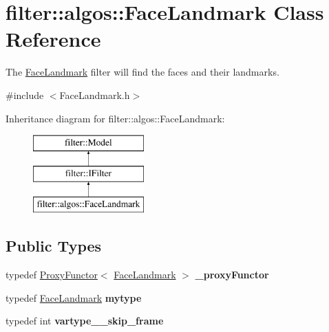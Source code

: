\hypertarget{classfilter_1_1algos_1_1_face_landmark}{}\section{filter\+:\+:algos\+:\+:Face\+Landmark Class Reference}
\label{classfilter_1_1algos_1_1_face_landmark}


The \hyperlink{classfilter_1_1algos_1_1_face_landmark}{Face\+Landmark} filter will find the faces and their landmarks.  




{\ttfamily \#include $<$Face\+Landmark.\+h$>$}

Inheritance diagram for filter\+:\+:algos\+:\+:Face\+Landmark\+:\begin{figure}[H]
\begin{center}
\leavevmode
\includegraphics[height=3.000000cm]{dc/d8b/classfilter_1_1algos_1_1_face_landmark}
\end{center}
\end{figure}
\subsection*{Public Types}
\begin{DoxyCompactItemize}
\item 
\mbox{\label{classfilter_1_1algos_1_1_face_landmark_ab916a495ad33d6879b0516210673981b}} 
typedef \hyperlink{class_proxy_functor}{Proxy\+Functor}$<$ \hyperlink{classfilter_1_1algos_1_1_face_landmark}{Face\+Landmark} $>$ {\bfseries \+\_\+proxy\+Functor}
\item 
\mbox{\label{classfilter_1_1algos_1_1_face_landmark_ac4503704d0dc53e61e40935f9584d5d1}} 
typedef \hyperlink{classfilter_1_1algos_1_1_face_landmark}{Face\+Landmark} {\bfseries mytype}
\item 
\mbox{\label{classfilter_1_1algos_1_1_face_landmark_a8d83414d1c84d98963889c2bbeabc9c7}} 
typedef int {\bfseries vartype\+\_\+\+\_\+skip\+\_\+frame}
\end{DoxyCompactItemize}
